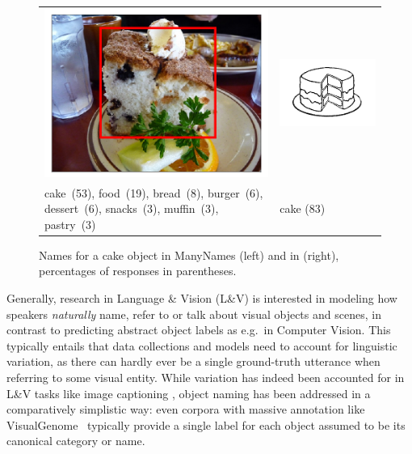 \begin{figure}[tbp]
\scriptsize
\begin{tabular}{p{4.3cm}p{2cm}}
\centering
\includegraphics[scale=0.15]{figures/2390077_1254219_supercat_unique.png} &
\includegraphics[scale=0.4]{figures/snodgrass_vanderwart_cake_042.png}\\
 cake\ (53),  food\ (19), bread\ (8), burger\ (6), dessert\ (6), snacks\ (3), muffin\ (3),  pastry\ (3) & \hspace{.9cm} cake (83)
\end{tabular}
\caption{Names for a cake object in ManyNames (left) and in \citet{snodgrass} (right), percentages of responses in parentheses.}
\label{fig:cake}
\vspace{-0.5cm}
\end{figure}

Generally, research in Language \& Vision (L\&V) is interested in modeling how speakers \textit{naturally} name, refer to or talk about visual objects and scenes, in contrast to predicting abstract object labels as e.g.\ in Computer Vision.
This typically entails that data collections and models need to account for linguistic variation, as there can hardly ever be a single ground-truth utterance when referring to some visual entity. 
While variation has indeed been accounted for in L\&V tasks like image captioning \cite{vedantam2015cider,Bernardietal:automatic,dai2017towards}, object naming has been addressed in a comparatively simplistic way: 
even corpora with massive annotation like VisualGenome~\cite[\vg henceforth]{krishna2016visualgenome} typically provide a single label for each object assumed to be its canonical category or name.

